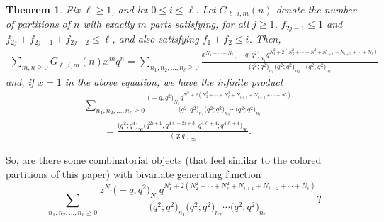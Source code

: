 \documentclass[pdftex]{sigma}
\numberwithin{equation}{section}
\newtheorem{Theorem}{Theorem}[section]
\theoremstyle{definition}
\begin{document}
\begin{Theorem}
Fix $\ell\ge 1$, and let $0\le i\le \ell$. Let $G_{\ell,i,m}(n)$ denote the number of partitions of $n$ with exactly $m$ parts satisfying, for all $j\ge1$, $f_{2j-1}\le 1$ and
$f_{2j}+f_{2j+1}+f_{2j+2}\le\ell$, and also satisfying $f_1+f_2\le i$. Then,
\begin{gather*}
\sum_{m,n \ge 0} G_{\ell,i,m}(n) x^m q^n = \sum_{n_1,n_2,\dots,n_{\ell}\ge 0} \frac{x^{N_1+\cdots+N_\ell} \bigl(-q,q^2\bigr)_{N_1}q^{N_1^2+2(N_2^2+\cdots+N_{\ell}^2+N_{i+1}+N_{i+2}+\cdots+N_{\ell})}}{\bigl(q^2;q^2\bigr)_{n_1}\bigl(q^2;q^2\bigr)_{n_2}\cdots\bigl(q^2;q^2\bigr)_{n_{\ell}}}
\end{gather*}
and, if $x=1$ in the above equation, we have the infinite product
\begin{align*}
&\sum_{n_1,n_2,\dots,n_{\ell}\ge 0} \frac{ \bigl(-q,q^2\bigr)_{N_1}q^{N_1^2+2(N_2^2+\cdots+N_{\ell}^2+N_{i+1}+N_{i+2}+\cdots+N_{\ell})}}{\bigl(q^2;q^2\bigr)_{n_1}\bigl(q^2;q^2\bigr)_{n_2}\cdots\bigl(q^2;q^2\bigr)_{n_{\ell}}} \\
&\qquad= \frac{\bigl(q^2;q^4\bigr)_\infty\bigl(q^{2i+1},q^{4\ell-2i+3},q^{4\ell+4};q^{4\ell+4}\bigr)_\infty}{(q;q)_\infty}.
\end{align*}
\end{Theorem}
So, are there some combinatorial objects (that feel similar to the colored partitions of this paper) with bivariate generating function
\begin{equation*}
\sum_{n_1,n_2,\dots,n_{\ell}\ge 0} \frac{z^{N_1} \bigl(-q,q^2\bigr)_{N_1}q^{N_1^2+2(N_2^2+\cdots+N_{\ell}^2+N_{i+1}+N_{i+2}+\cdots+N_{\ell})}}{\bigl(q^2;q^2\bigr)_{n_1}\bigl(q^2;q^2\bigr)_{n_2}\cdots\bigl(q^2;q^2\bigr)_{n_{\ell}}}?
\end{equation*}
\end{document}
